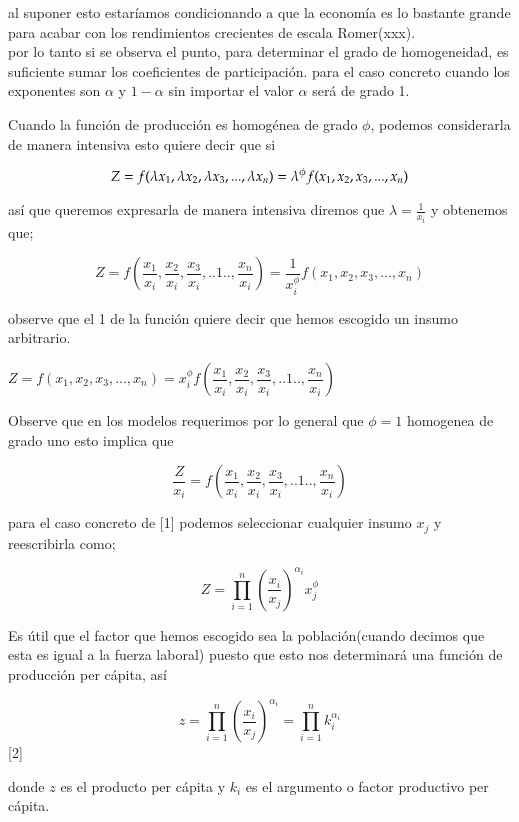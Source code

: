 \documentclass[12pt]{article}
\begin{document}
 al suponer esto estaríamos condicionando a que la economía es lo bastante grande para acabar con los rendimientos crecientes de escala Romer(xxx).
\\ 
 
 por lo tanto si se observa el punto, para determinar el grado de homogeneidad, es suficiente sumar los coeficientes de participación.
para el caso concreto cuando los exponentes son $\alpha$ y $1-\alpha$ sin importar el valor $\alpha$ será de grado 1. 

Cuando la función de producción es homogénea de grado $\phi$, podemos considerarla de manera intensiva esto quiere decir que si

 
$$Z=f(\lambda x_1,\lambda x_2,\lambda x_3,...,\lambda x_n)\\ =
\lambda^{\phi}f(x_1,x_2,x_3,...,x_n) $$

así que queremos expresarla de manera intensiva diremos que $\lambda=\frac{1}{x_{i}}$
y obtenemos que;


$$Z=f( \dfrac{x_1}{x_i},\dfrac{x_2}{x_i},\dfrac{x_3}{x_i},..1..,\dfrac{x_n}{x_i}) =
\dfrac{1}{x_i^{\phi}}f(x_1,x_2,x_3,...,x_n) $$

observe que el 1 de la función quiere decir que hemos escogido un insumo arbitrario. 

$Z = f(x_1,x_2,x_3,...,x_n) =  x_i^\phi f( \dfrac{x_1}{x_i},\dfrac{x_2}{x_i},\dfrac{x_3}{x_i},..1..,\dfrac{x_n}{x_i})$

Observe que en los modelos requerimos por lo general que $\phi=1$ homogenea de grado uno esto implica que 

$$
\dfrac{Z}{x_i}=f( \dfrac{x_1}{x_i},\dfrac{x_2}{x_i},\dfrac{x_3}{x_i},..1..,\dfrac{x_n}{x_i})$$

para el caso concreto de [1] podemos seleccionar cualquier insumo $x_j$ y reescribirla como; 


$$Z=\prod_{i=1}^n \left( \frac{x_i}{x_j}\right)^{\alpha_i} x_j^{\phi}$$






Es útil que el factor que hemos escogido sea la población(cuando decimos que esta es igual a la fuerza laboral) puesto que esto nos determinará una función de producción per cápita, así


 $$z=\prod_{i=1}^n \left( \frac{x_i}{x_j}\right)^{\alpha_i}  =\prod_{i=1}^n k_{i}^{\alpha_i}$$  [2]

donde $z$ es el producto per cápita y $k_{i}$ es el argumento o factor productivo per cápita.
\end{document}
